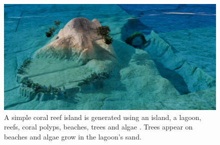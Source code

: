 \begin{figure}[H]
\includegraphics{multiScene1 v2 final 1.png}
\caption{A simple coral reef island is generated using an island, a lagoon, reefs, coral polyps, beaches, trees and algae . Trees appear on beaches and algae grow in the lagoon's sand.}
\label{fig:env-obj-coral-island-scene}
\end{figure}










































